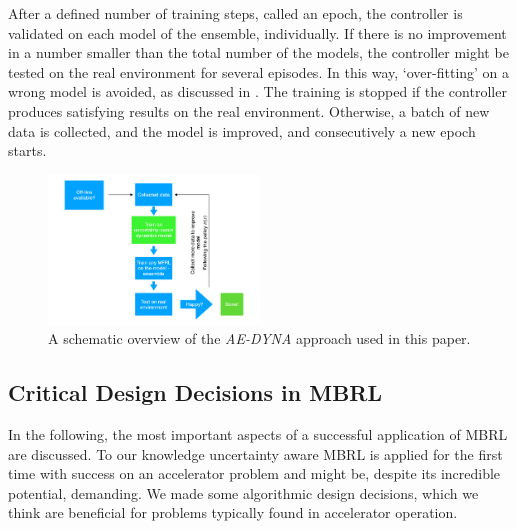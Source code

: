 \documentclass[
reprint,nofootinbib,
amsmath,amssymb,amsfonts,clevref,
aps,
prstab,
]{revtex4-2}
\begin{document}
	After a defined number of training steps, called an epoch, the controller is validated on each model of the ensemble, individually. If there is no improvement in a number smaller than the total number of the models, the controller might be tested on the real environment for several episodes. In this way, `over-fitting' on a wrong model is avoided, as discussed in \cite{Kurutach2018}. The training is stopped if the controller produces satisfying results on the real environment. Otherwise, a batch of new data is collected, and the model is improved, and consecutively a new epoch starts.
	\begin{figure}[!h]
		\centering
		\includegraphics*[width=0.5\textwidth]{Figures/MBRL_overview}
		\caption{A schematic overview of the \emph{AE-DYNA} approach used in this paper.}
		\label{fig:MBRL_overview}
	\end{figure}
	\subsection{Critical Design Decisions in MBRL}\label{ss:critical_design}
	In the following, the most important aspects of a successful application of MBRL are discussed. To our knowledge uncertainty aware MBRL is applied for the first time with success on an accelerator problem and might be, despite its incredible potential, demanding. We made some algorithmic design decisions, which we think are beneficial for problems typically found in accelerator operation.\\
\end{document}
